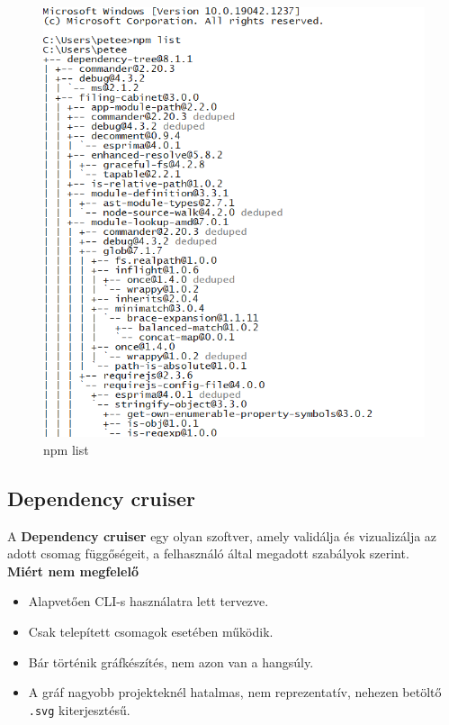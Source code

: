 	\begin{figure}[h]
		\centering
		\includegraphics[scale=0.45]{images/npm_ls.png}
		\caption{npm list}
		\label{fig:npm-ls}
	\end{figure}
	
	\subsection{Dependency cruiser}
	
	A \textbf{Dependency cruiser} egy olyan szoftver, amely validálja és vizualizálja az adott csomag függőségeit, a felhasználó által megadott szabályok szerint.\\
	
	\textbf{Miért nem megfelelő}
	\begin{itemize}
		\item Alapvetően CLI-s használatra lett tervezve.
		\item Csak telepített csomagok esetében működik.
		\item Bár történik gráfkészítés, nem azon van a hangsúly.
		\item A gráf nagyobb projekteknél hatalmas, nem reprezentatív, nehezen betöltő \texttt{.svg} kiterjesztésű.
	\end{itemize}
	
